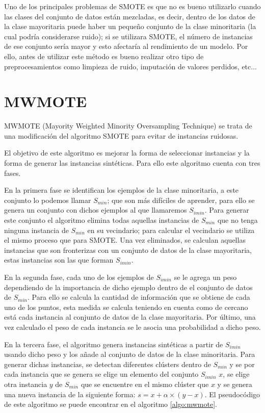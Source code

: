 Uno de los principales problemas de SMOTE es que no es bueno utilizarlo cuando las clases del conjunto de datos están mezcladas, es decir, dentro de los datos de la clase mayoritaria puede haber un pequeño conjunto de la clase minoritaria (la cual podría considerarse ruido); si se utilizara SMOTE, el número de instancias de ese conjunto sería mayor y esto afectaría al rendimiento de un modelo. Por ello, antes de utilizar este método es bueno realizar otro tipo de preprocesamientos como limpieza de ruido, imputación de valores perdidos, etc...
\newpage
\section{MWMOTE}
MWMOTE (Mayority Weighted Minority Oversampling Technique) \cite{barua2012mwmote} se trata de una modificación del algoritmo SMOTE para evitar de instancias ruidosas.\newline

El objetivo de este algoritmo es mejorar la forma de seleccionar instancias y la forma de generar las instancias sintéticas. Para ello este algoritmo cuenta con tres fases.\newline

En la primera fase se identifican los ejemplos de la clase minoritaria, a este conjunto lo podemos llamar $S_{min}$; que son más difíciles de aprender, para ello se genera un conjunto con dichos ejemplos al que llamaremos $S_{imin}$. Para generar este conjunto el algoritmo elimina todas aquellas instancias de $S_{min}$ que no tenga ninguna instancia de $S_{min}$ en su vecindario; para calcular el vecindario se utiliza el mismo proceso que para SMOTE. Una vez eliminados, se calculan aquellas instancias que son fronterizas con un conjunto de datos de la clase mayoritaria, estas instancias son las que forman $S_{imin}$.\newline

En la segunda fase, cada uno de los ejemplos de $S_{imin}$ se le agrega un peso dependiendo de la importancia de dicho ejemplo dentro de el conjunto de datos de $S_{min}$. Para ello se calcula la cantidad de información que se obtiene de cada uno de los puntos, esta medida se calcula teniendo en cuenta como de cercano está cada instancia al conjunto de datos de la clase mayoritaria. Por último, una vez calculado el peso de cada instancia se le asocia una probabilidad a dicho peso.\newline

En la tercera fase, el algoritmo genera instancias sintéticas a partir de $S_{imin}$ usando dicho peso y los añade al conjunto de datos de la clase minoritaria. Para generar dichas instancias, se detectan diferentes clústers dentro de $S_{min}$ y se por cada instancia que se genera se elige un elemento del conjunto $S_{imin}$ $x$, se elige otra instancia $y$ de $S_{min}$ que se encuentre en el mismo clúster que $x$ y se genera una nueva instancia de la siguiente forma: $ s = x + \alpha \times (y-x)$. El pseudocódigo de este algoritmo se puede encontrar en el algoritmo \ref{algo:mwmote}.

